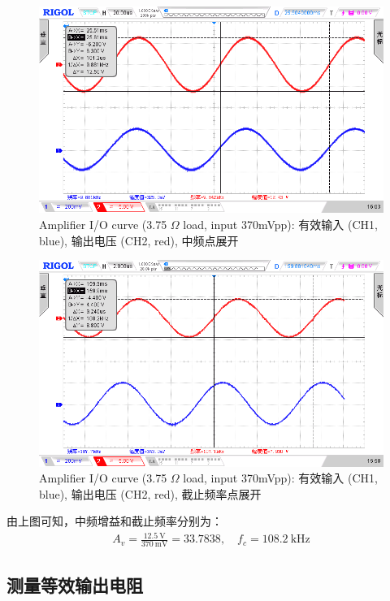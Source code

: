 \documentclass[UTF8]{article}
\begin{document}
\begin{figure}[H]\centering
    \includegraphics[width=\columnwidth]{LCE-03-功率放大器/assets/实验照片/3R5扫频测试 中频展开.png}
    \caption{Amplifier I/O curve (3.75 $\Omega$ load, input 370mVpp): 有效输入 (CH1, blue), 输出电压 (CH2, red), 中频点展开}
\end{figure}
\begin{figure}[H]\centering
    \includegraphics[width=\columnwidth]{LCE-03-功率放大器/assets/实验照片/3R5扫频测试 3dB 展开.png}
    \caption{Amplifier I/O curve (3.75 $\Omega$ load, input 370mVpp): 有效输入 (CH1, blue), 输出电压 (CH2, red), 截止频率点展开}
\end{figure}

由上图可知，中频增益和截止频率分别为：
\begin{gather}
A_v = \frac{12.5 \ \mathrm{V}}{370 \ \mathrm{mV}} = 33.7838,\quad 
f_c = 108.2 \ \mathrm{kHz}
\end{gather}

\subsection{测量等效输出电阻}
\end{document}

